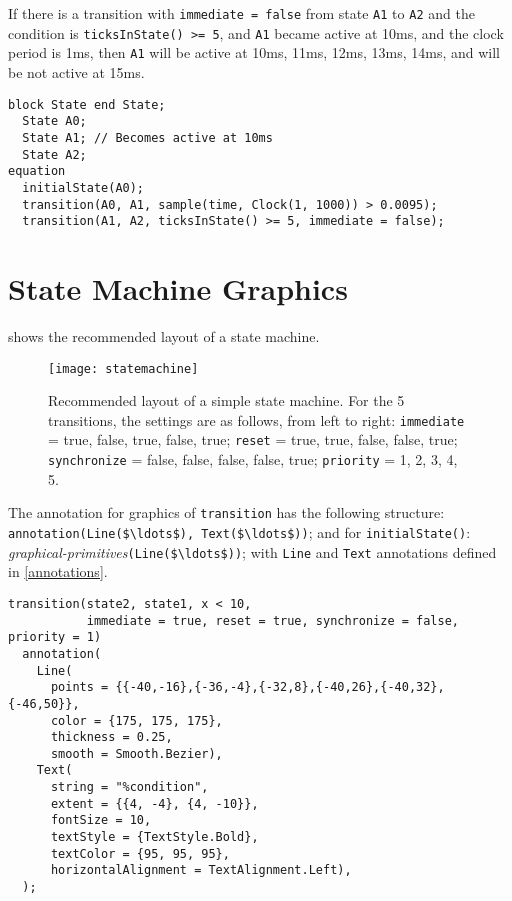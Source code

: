 \begin{example}
If there is a transition with \lstinline!immediate = false! from state \lstinline!A1! to \lstinline!A2! and the condition is \lstinline!ticksInState() >= 5!, and \lstinline!A1! became active at 10ms, and the clock period is 1ms, then \lstinline!A1! will be active at 10ms, 11ms, 12ms, 13ms, 14ms, and will be not active at 15ms.
\begin{lstlisting}[language=modelica]
  block State end State;
  State A0;
  State A1; // Becomes active at 10ms
  State A2;
equation
  initialState(A0);
  transition(A0, A1, sample(time, Clock(1, 1000)) > 0.0095);
  transition(A1, A2, ticksInState() >= 5, immediate = false);
\end{lstlisting}
\end{example}

\section{State Machine Graphics}\label{state-machine-graphics}

\begin{nonnormative}
 shows the recommended layout of a state machine.
\end{nonnormative}

\begin{figure}[H]
  \begin{center}
    \texttt{[image: statemachine]}
  \end{center}
  \caption{Recommended layout of a simple state machine.
  For the 5 transitions, the settings are as follows, from left to right: \lstinline!immediate! = true, false, true, false, true; \lstinline!reset! = true, true, false, false, true; \lstinline!synchronize! = false, false, false, false, true; \lstinline!priority! = 1, 2, 3, 4, 5.}
  \label{fig:state-machine-layout}
\end{figure}

The annotation for graphics of \lstinline!transition! has the following structure: \lstinline!annotation(Line($\ldots$), Text($\ldots$))!; and for \lstinline!initialState()!: \emph{graphical-primitives}\lstinline!(Line($\ldots$))!; with \lstinline!Line! and \lstinline!Text! annotations defined in \cref{annotations}.

\begin{example}
\begin{lstlisting}[language=modelica]
transition(state2, state1, x < 10,
           immediate = true, reset = true, synchronize = false, priority = 1)
  annotation(
    Line(
      points = {{-40,-16},{-36,-4},{-32,8},{-40,26},{-40,32},{-46,50}},
      color = {175, 175, 175},
      thickness = 0.25,
      smooth = Smooth.Bezier),
    Text(
      string = "%condition",
      extent = {{4, -4}, {4, -10}},
      fontSize = 10,
      textStyle = {TextStyle.Bold},
      textColor = {95, 95, 95},
      horizontalAlignment = TextAlignment.Left),
  );
\end{lstlisting}
\end{example}

